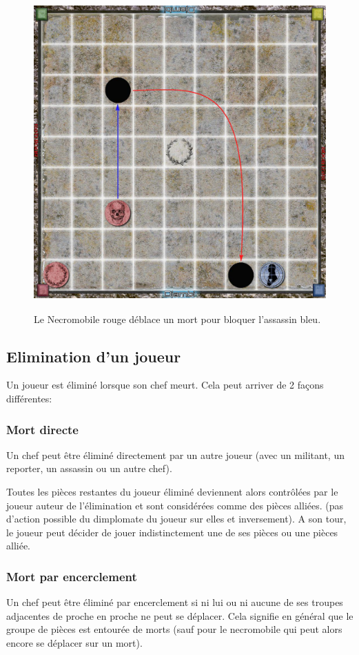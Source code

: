 \documentclass{article}
\begin{document}
\begin{figure}[ht]
\centering
\includegraphics[width=4.75972in,height=4.76111in]{media/image7.png}
\caption{Le Necromobile rouge déblace un mort pour bloquer l'assassin bleu.}
\end{figure}
\newpage





\subsection{Elimination d'un joueur}
Un joueur est éliminé lorsque son chef meurt. Cela peut arriver de 2 façons différentes:

\subsubsection{Mort directe}
Un chef peut être éliminé directement par un autre joueur (avec un militant, un reporter, un assassin ou un autre chef).


Toutes les pièces restantes du joueur éliminé deviennent alors contrôlées par le joueur auteur de l'élimination et sont considérées comme des pièces alliées.
(pas d'action possible du dimplomate du joueur sur elles et inversement). A son tour, le joueur peut décider de jouer indistinctement une de ses pièces ou une pièces alliée.

\subsubsection{Mort par encerclement}
Un chef peut être éliminé par encerclement si ni lui ou ni aucune de ses troupes adjacentes de proche en proche ne peut se déplacer.
Cela signifie en général que le groupe de pièces est entourée de morts (sauf pour le necromobile qui peut alors encore se déplacer sur un mort).
\end{document}
